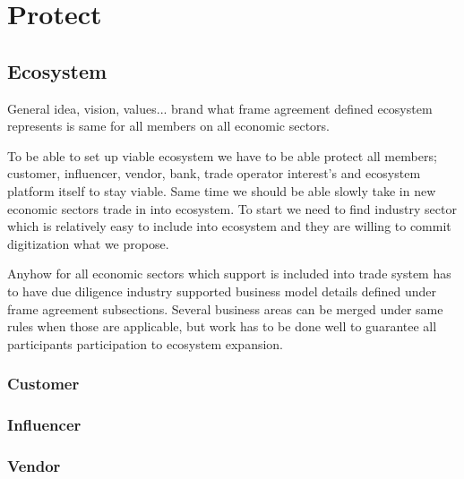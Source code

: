%
%
%
\part{Protect}
\label{protect}
\chapter{Ecosystem}
General idea, vision, values... brand what frame agreement defined ecosystem represents is same for all members on all economic sectors.

To be able to set up viable ecosystem we have to be able protect all members; customer, influencer, vendor, bank, trade operator interest's and ecosystem platform itself to stay viable. Same time we should be able slowly take in new economic sectors trade in into ecosystem. To start we need to find industry sector which is relatively easy to include into ecosystem and they are willing to commit digitization what we propose.

Anyhow for all economic sectors which support is included into trade system has to have due diligence industry supported business model details defined under frame agreement subsections. Several business areas can be merged under same rules when those are applicable, but work has to be done well to guarantee all participants participation to ecosystem expansion.

\section{Customer}
\label{protect_customer}

\section{Influencer}
\label{protect_influencer}

\section{Vendor}
\label{protect_vendor}

